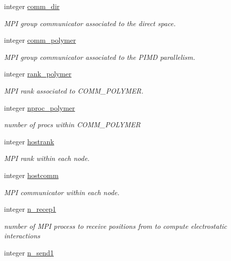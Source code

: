 \begin{DoxyCompactItemize}
integer \hyperlink{classdomdec_a383993116087900b4f889f3f077dc01d}{comm\-\_\-dir}
\begin{DoxyCompactList}\small\item\em M\-P\-I group communicator associated to the direct space. \end{DoxyCompactList}\item 
integer \hyperlink{classdomdec_ad5faf93f8356aea734a9ed5012fb597b}{comm\-\_\-polymer}
\begin{DoxyCompactList}\small\item\em M\-P\-I group communicator associated to the P\-I\-M\-D parallelism. \end{DoxyCompactList}\item 
integer \hyperlink{classdomdec_aa41e5fcea13c9f7a65a84836b19537ff}{rank\-\_\-polymer}
\begin{DoxyCompactList}\small\item\em M\-P\-I rank associated to C\-O\-M\-M\-\_\-\-P\-O\-L\-Y\-M\-E\-R. \end{DoxyCompactList}\item 
integer \hyperlink{classdomdec_a26e164f3a2e4deb7d3019cca4530085b}{nproc\-\_\-polymer}
\begin{DoxyCompactList}\small\item\em number of procs within C\-O\-M\-M\-\_\-\-P\-O\-L\-Y\-M\-E\-R \end{DoxyCompactList}\item 
integer \hyperlink{classdomdec_ad66c1bf2823b5f06138088c6bee198be}{hostrank}
\begin{DoxyCompactList}\small\item\em M\-P\-I rank within each node. \end{DoxyCompactList}\item 
integer \hyperlink{classdomdec_a006e80bdb6f5a7397a372768683257b2}{hostcomm}
\begin{DoxyCompactList}\small\item\em M\-P\-I communicator within each node. \end{DoxyCompactList}\item 
integer \hyperlink{classdomdec_acd38a6940b147be68ded2ad9b20370f2}{n\-\_\-recep1}
\begin{DoxyCompactList}\small\item\em number of M\-P\-I process to receive positions from to compute electrostatic interactions \end{DoxyCompactList}\item 
integer \hyperlink{classdomdec_aa8487a458ef4e84212822190663db9a8}{n\-\_\-send1}

\end{DoxyCompactItemize}
